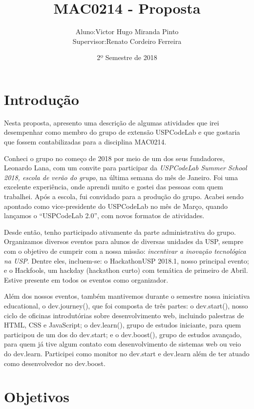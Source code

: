\documentclass[10pt,twoside,a4paper]{article}
\title{MAC0214 - Proposta}
\author{
  \begin{tabular}{rl}
    Aluno:      & Victor Hugo Miranda Pinto \\
    Supervisor: & Renato Cordeiro Ferreira
  \end{tabular}
}
\date{2º Semestre de 2018}
\begin{document}
\maketitle

\section{Introdução}

    Nesta proposta, apresento uma descrição de algumas atividades que irei desempenhar como membro do grupo de extensão USPCodeLab e que gostaria que fossem contabilizadas para a disciplina MAC0214.
    
    Conheci o grupo no começo de 2018 por meio de um dos seus fundadores, Leonardo Lana, com um convite para participar da \textit{USPCodeLab Summer School 2018, escola de verão do grupo}, na última semana do mês de Janeiro. Foi uma excelente experiência, onde aprendi muito e gostei das pessoas com quem trabalhei. Após a escola, fui convidado para a produção do grupo. Acabei sendo apontado como vice-presidente do USPCodeLab no mês de Março, quando lançamos o “USPCodeLab 2.0”, com novos formatos de atividades. 
    
    Desde então, tenho participado ativamente da parte administrativa do grupo. Organizamos diversos eventos para alunos de diversas unidades da USP, sempre com o objetivo de cumprir com a nossa missão: \textit{incentivar a inovação tecnológica na USP}. Dentre eles, incluem-se: o HackathonUSP 2018.1, nosso principal evento; e o Hackfools, um hackday (hackathon curto) com temática de primeiro de Abril. Estive presente em todos os eventos como organizador.

    Além dos nossos eventos, também mantivemos durante o semestre nossa iniciativa educational, o dev.journey(), que foi composta de três partes: o dev.start(), nosso ciclo de oficinas introdutórias sobre desenvolvimento web, incluindo palestras de HTML, CSS e JavaScript; o dev.learn(), grupo de estudos iniciante, para quem participou de um dos do dev.start; e o dev.boost(), grupo de estudos avançado, para quem já tive algum contato com desenvolvimento de sistemas web ou veio do dev.learn. Participei como monitor no dev.start e dev.learn além de ter atuado como desenvolvedor no dev.boost.



\section{Objetivos}
\end{document}
